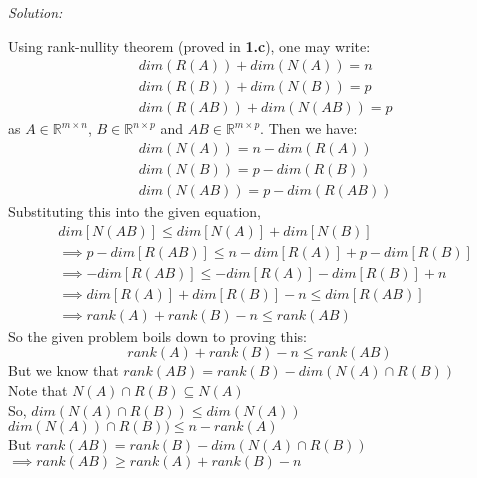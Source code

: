 \documentclass[fleqn]{article}
\newenvironment{solution}
    {\textit{Solution:}}
    {}
\begin{document}
\begin{solution}
\begin{enumerate}[label=(\alph*)]
    Using rank-nullity theorem (proved in \textbf{1.c}), one may write:
    \begin{equation*}
        \begin{split}
            &dim(R(A)) + dim(N(A)) = n\\
            &dim(R(B)) + dim(N(B)) = p\\
            &dim(R(AB)) + dim(N(AB)) = p
        \end{split}
    \end{equation*}
    as $A \in \mathbb{R}^{m \times n}$, $B \in \mathbb{R}^{n \times p}$ and $AB \in \mathbb{R}^{m \times p}$.
    Then we have:
    \begin{equation*}
        \begin{split}
           &dim(N(A)) = n - dim(R(A))\\
           &dim(N(B)) = p - dim(R(B))\\
           &dim(N(AB)) = p - dim(R(AB))
        \end{split}
    \end{equation*}
    Substituting this into the given equation,
    \begin{equation*}
        \begin{split}
            &dim[N(AB)] \leq dim[N(A)] + dim[N(B)]\\
            &\implies p - dim[R(AB)] \leq n - dim[R(A)] + p - dim[R(B)]\\
            &\implies -dim[R(AB)] \leq -dim[R(A)] -dim[R(B)] + n\\
            &\implies dim[R(A)] + dim[R(B)] - n \leq dim[R(AB)]\\
            &\implies rank(A) + rank(B) - n \leq rank(AB)
        \end{split}
    \end{equation*}
    So the given problem boils down to proving this:
    \begin{equation*}
        rank(A) + rank(B) - n \leq rank(AB)
    \end{equation*}
    But we know that $rank(AB) = rank(B) - dim(N(A) \cap R(B))$\\
    Note that $N(A) \cap R(B) \subseteq N(A)$\\
    So, $dim(N(A) \cap R(B)) \leq dim(N(A))$\\
    $dim(N(A)) \cap R(B)) \leq n - rank(A)$\\
    But $rank(AB) = rank(B) - dim(N(A) \cap R(B))$\\
    $\implies rank(AB) \geq rank(A) + rank(B) - n$\\


\end{enumerate}
\end{solution}
\end{document}
